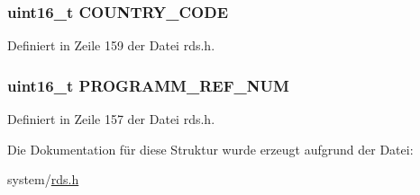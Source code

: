 \subsubsection[{C\+O\+U\+N\+T\+R\+Y\+\_\+\+C\+O\+D\+E}]{\setlength{\rightskip}{0pt plus 5cm}uint16\+\_\+t C\+O\+U\+N\+T\+R\+Y\+\_\+\+C\+O\+D\+E}\label{structpi_a104410f64e8aa7ab69f76a5ee53a0a8a}


Definiert in Zeile 159 der Datei rds.\+h.

\hypertarget{structpi_aa0995bba54da782b6ff03d66f16e3c57}{}
\subsubsection[{P\+R\+O\+G\+R\+A\+M\+M\+\_\+\+R\+E\+F\+\_\+\+N\+U\+M}]{\setlength{\rightskip}{0pt plus 5cm}uint16\+\_\+t P\+R\+O\+G\+R\+A\+M\+M\+\_\+\+R\+E\+F\+\_\+\+N\+U\+M}\label{structpi_aa0995bba54da782b6ff03d66f16e3c57}


Definiert in Zeile 157 der Datei rds.\+h.



Die Dokumentation für diese Struktur wurde erzeugt aufgrund der Datei\+:\begin{DoxyCompactItemize}
\item 
system/\hyperlink{rds_8h}{rds.\+h}\end{DoxyCompactItemize}
